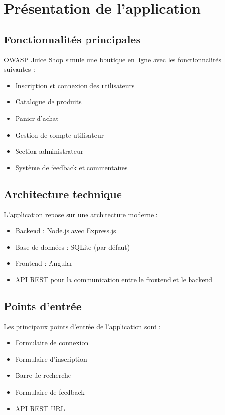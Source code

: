 
\chapter{Présentation de l'application}

\section{Fonctionnalités principales}
OWASP Juice Shop simule une boutique en ligne avec les fonctionnalités suivantes :
\begin{itemize}
    \item Inscription et connexion des utilisateurs
    \item Catalogue de produits
    \item Panier d'achat
    \item Gestion de compte utilisateur
    \item Section administrateur
    \item Système de feedback et commentaires
\end{itemize}

\section{Architecture technique}
L'application repose sur une architecture moderne :
\begin{itemize}
    \item Backend : Node.js avec Express.js
    \item Base de données : SQLite (par défaut)
    \item Frontend : Angular
    \item API REST pour la communication entre le frontend et le backend
\end{itemize}

\section{Points d'entrée}
Les principaux points d'entrée de l'application sont :
\begin{itemize}
    \item Formulaire de connexion
    \item Formulaire d'inscription
    \item Barre de recherche
    \item Formulaire de feedback
    \item API REST
     URL
\end{itemize}
